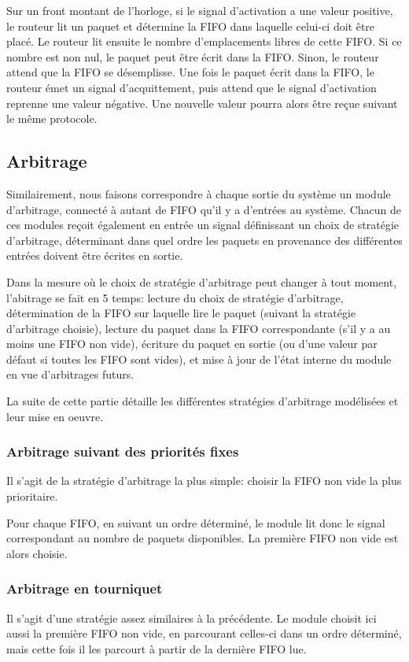 \documentclass[11pt]{article}
\begin{document}
Sur un front montant de l'horloge, si le signal d'activation a une valeur positive,
le routeur lit un paquet et détermine la FIFO dans laquelle celui-ci doit être placé.
Le routeur lit ensuite le nombre d'emplacements libres de cette FIFO.
Si ce nombre est non nul, le paquet peut être écrit dans la FIFO.
Sinon, le routeur attend que la FIFO se désemplisse.
Une fois le paquet écrit dans la FIFO, le routeur émet un signal d'acquittement,
puis attend que le signal d'activation reprenne une valeur négative.
Une nouvelle valeur pourra alors être reçue suivant le même protocole.

\subsection{Arbitrage}
Similairement, nous faisons correspondre à chaque sortie du système un module d'arbitrage, connecté à autant de FIFO qu'il y a d'entrées au système.
Chacun de ces modules reçoit également en entrée un signal définissant un choix de stratégie d'arbitrage, déterminant dans quel ordre
les paquets en provenance des différentes entrées doivent être écrites en sortie.

Dans la mesure où le choix de stratégie d'arbitrage peut changer à tout moment,
l'abitrage se fait en 5 temps:
lecture du choix de stratégie d'arbitrage,
détermination de la FIFO sur laquelle lire le paquet (suivant la stratégie d'arbitrage choisie),
lecture du paquet dans la FIFO correspondante (s'il y a au moins une FIFO non vide),
écriture du paquet en sortie (ou d'une valeur par défaut si toutes les FIFO sont vides),
et mise à jour de l'état interne du module en vue d'arbitrages futurs.

La suite de cette partie détaille les différentes stratégies d'arbitrage modélisées et leur mise en oeuvre.

\subsubsection{Arbitrage suivant des priorités fixes}
Il s'agit de la stratégie d'arbitrage la plus simple: choisir la FIFO non vide la plus prioritaire.

Pour chaque FIFO, en suivant un ordre déterminé, le module lit donc le signal correspondant au nombre
de paquets disponibles.
La première FIFO non vide est alors choisie.

\subsubsection{Arbitrage en tourniquet}
Il s'agit d'une stratégie assez similaires à la précédente.
Le module choisit ici aussi la première FIFO non vide, en parcourant celles-ci dans un ordre déterminé,
mais cette fois il les parcourt à partir de la dernière FIFO lue.
\end{document}
